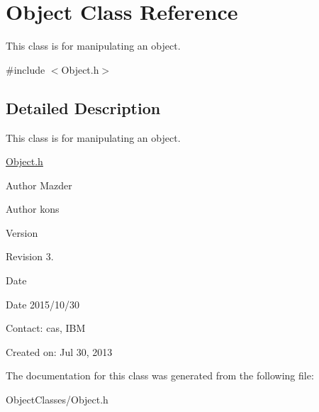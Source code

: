 \hypertarget{class_object}{}\section{Object Class Reference}
\label{class_object}


This class is for manipulating an object.  




{\ttfamily \#include $<$Object.\+h$>$}



\subsection{Detailed Description}
This class is for manipulating an object. 

\hyperlink{_object_8h_source}{Object.\+h}

\begin{DoxyAuthor}{Author}
Mazder 
\end{DoxyAuthor}
\begin{DoxyParagraph}{Author}
kons 
\end{DoxyParagraph}


\begin{DoxyVersion}{Version}

\end{DoxyVersion}
\begin{DoxyParagraph}{Revision}
3. 
\end{DoxyParagraph}


\begin{DoxyDate}{Date}

\end{DoxyDate}
\begin{DoxyParagraph}{Date}
2015/10/30 
\end{DoxyParagraph}


Contact\+: cas, I\+B\+M

Created on\+: Jul 30, 2013 

The documentation for this class was generated from the following file\+:\begin{DoxyCompactItemize}
\item 
Object\+Classes/Object.\+h\end{DoxyCompactItemize}
